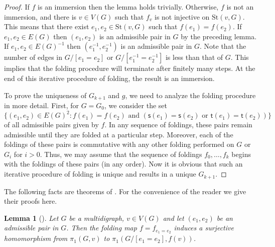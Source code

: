 \documentclass[11pt]{amsart}
\newtheorem{lemma}[theorem]{Lemma}
\theoremstyle{definition}
\theoremstyle{definition}
\numberwithin{equation}{section}
\begin{document}
\begin{proof} If $f$ is an immersion then the lemma holds trivially. Otherwise, $f$ is not an immersion, and there is $v\in V(G)$ such that $f_v$ is not injective on $\mbox{St}(v, G)$. This means that there exist $e_1, e_2\in \mbox{St}(v, G)$ such that $f(e_1)=f(e_2)$. If $e_1, e_2\in E(G)$ then $(e_1, e_2)$ is an admissible pair in $G$ by the preceding lemma. If $e_1, e_2\in E(G)^{-1}$ then $(e_1^{-1}, e_2^{-1})$ is an admissible pair in $G$. Note that the number of edges in $G/[e_1=e_2]$ or $G/[e_1^{-1}= e_2^{-1}]$ is less than that of $G$. This implies that the folding procedure will terminate after finitely many steps. At the end of this iterative procedure of folding, the result is an immersion.

To prove the uniqueness of $G_{k+1}$ and $g$, we need to analyze the folding procedure in more detail. First, for $G=G_0$, we consider the set
$$ \{(e_1, e_2)\in E(G)^2\colon f(e_1)=f(e_2) \mbox{ and } (\mathsf{s}(e_1)=\mathsf{s}(e_2) \mbox{ or } \mathsf{t}(e_1)=\mathsf{t}(e_2)) \} $$
of all admissible pairs given by $f$. In any sequence of foldings, these pairs remain admissible until they are folded at a particular step. Moreover, each of the foldings of these pairs is commutative with any other folding performed on $G$ or $G_i$ for $i>0$. Thus, we may assume that the sequence of foldings $f_0, \dots, f_k$ begins with the foldings of these pairs (in any order). Now it is obvious that such an iterative procedure of folding is unique and results in a unique $G_{k+1}$.
\end{proof}

The following facts are theorems of \cite{St83}. For the convenience of the reader we give their proofs here.

\begin{lemma}[{\cite[Corollary 4.4]{St83}}] \label{lem:surj} Let $G$ be a multidigraph, $v\in V(G)$ and let $(e_1,e_2)$ be an admissible pair in $G$. Then the folding map $f=f_{e_1=e_2}$ induces a surjective homomorphism from $\pi_1(G, v)$ to $\pi_1(G/[e_1=e_2], f(v))$. 
\end{lemma}
\end{document}
